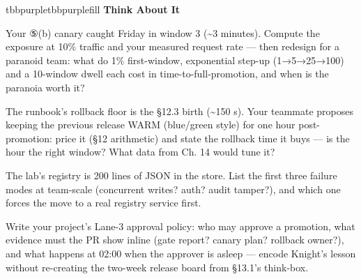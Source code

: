 \begin{calloutbox}{tbbpurple}{tbbpurplefill}
{\normalsize\bfseries\color{tbbpurple}Think About It}\par\vspace{3pt}
\begin{tbbitemize}
  \item Your ⑤(b) canary caught Friday in window 3 (\textasciitilde{}3 minutes). Compute the exposure at 10\% traffic and your measured request rate — then redesign for a paranoid team: what do 1\% first-window, exponential step-up (1→5→25→100) and a 10-window dwell each cost in time-to-full-promotion, and when is the paranoia worth it?
  \item The runbook's rollback floor is the §12.3 birth (\textasciitilde{}150 s). Your teammate proposes keeping the previous release WARM (blue/green style) for one hour post-promotion: price it (§12 arithmetic) and state the rollback time it buys — is the hour the right window? What data from Ch. 14 would tune it?
  \item The lab's registry is 200 lines of JSON in the store. List the first three failure modes at team-scale (concurrent writes? auth? audit tamper?), and which one forces the move to a real registry service first.
  \item Write your project's Lane-3 approval policy: who may approve a promotion, what evidence must the PR show inline (gate report? canary plan? rollback owner?), and what happens at 02:00 when the approver is asleep — encode Knight's lesson without re-creating the two-week release board from §13.1's think-box.
\end{tbbitemize}
\end{calloutbox}




